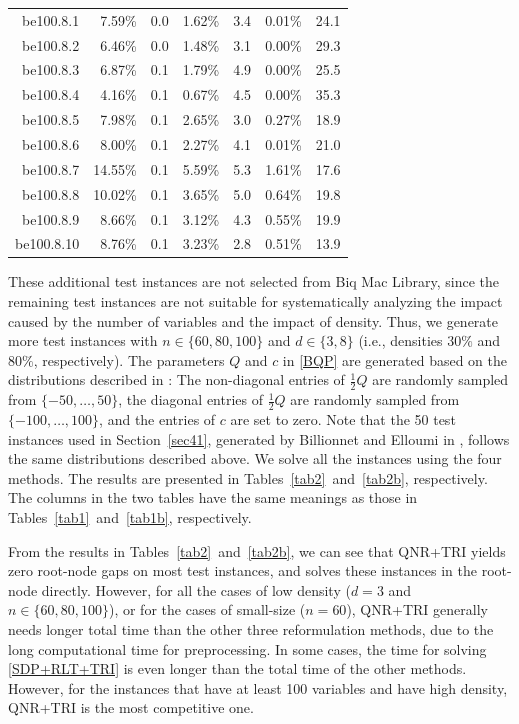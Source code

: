 \documentclass[pdflatex,sn-mathphys-num]{sn-jnl}%
\theoremstyle{thmstyleone}%
\theoremstyle{thmstyletwo}%
\theoremstyle{thmstylethree}%
\begin{document}
\begin{table}[h!]
{\begin{tabular}{rrrrrrr}
		be100.8.1 &7.59\% &0.0 &1.62\% &3.4 &0.01\% &24.1  \\
		be100.8.2 &6.46\% &0.0 &1.48\% &3.1 &0.00\% &29.3  \\
		be100.8.3 &6.87\% &0.1 &1.79\% &4.9 &0.00\% &25.5  \\
		be100.8.4 &4.16\% &0.1 &0.67\% &4.5 &0.00\% &35.3  \\
		be100.8.5 &7.98\% &0.1 &2.65\% &3.0 &0.27\% &18.9  \\
		be100.8.6 &8.00\% &0.1 &2.27\% &4.1 &0.01\% &21.0  \\
		be100.8.7 &14.55\% &0.1 &5.59\% &5.3 &1.61\% &17.6  \\
		be100.8.8 &10.02\% &0.1 &3.65\% &5.0 &0.64\% &19.8  \\
		be100.8.9 &8.66\% &0.1 &3.12\% &4.3 &0.55\% &19.9  \\
		be100.8.10 &8.76\% &0.1 &3.23\% &2.8 &0.51\% &13.9  \\
		\bottomrule
	\end{tabular}
}
\end{table}		

These additional test instances are not selected from Biq Mac Library, since the remaining test instances are not suitable for systematically analyzing the impact caused by the number of variables and the impact of density. Thus, we generate more test instances with $n\in\{60,80,100\}$ and $d\in\{3,8\}$ (i.e., densities $30\%$ and $80\%$, respectively). The parameters $Q$ and $c$ in \eqref{BQP} are generated based on the distributions described in \cite{Pardalos1990}: The non-diagonal entries of $\frac{1}{2}Q$ are randomly sampled from $\{-50,\ldots,50\}$, the diagonal entries of $\frac{1}{2}Q$ are randomly sampled from $\{-100,\ldots,100\}$, and the entries of $c$ are set to zero. Note that the 50 test instances used in Section~\ref{sec41}, generated by Billionnet and Elloumi in \cite{Billionnet2007}, follows the same distributions described above. We solve all the instances using the four methods. The results are presented in Tables~\ref{tab2}~and~\ref{tab2b}, respectively. The columns in the two tables have the same meanings as those in Tables~\ref{tab1}~and~\ref{tab1b}, respectively.

From the results in  Tables~\ref{tab2}~and~\ref{tab2b}, we can see that QNR+TRI yields zero root-node gaps on most test instances, and solves these instances in the root-node directly. However, for all the cases of low density ($d=3$ and $n\in \{60,80,100\}$), or for the cases of small-size ($n=60$), QNR+TRI  generally needs longer total time than the other three reformulation methods, due to the long computational time for preprocessing. In some cases, the time for solving \eqref{SDP+RLT+TRI} is even longer than the total time of the other methods. However, for the instances that have at least 100 variables and have high density, QNR+TRI is the most competitive one.
\end{document}
